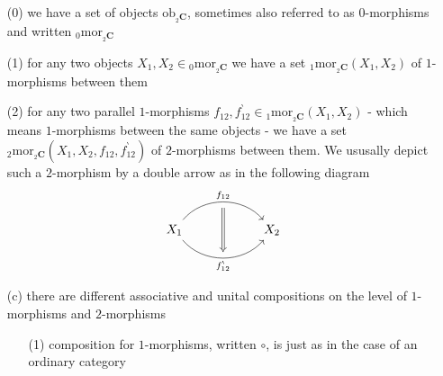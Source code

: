 \begin{enumerate}
\item[(0)]
we have a set of objects $\mathrm{ob}_{{_{2}\mathbf{C}}}$, sometimes also referred to as $0$-morphisms and written ${_{0}}\mathrm{mor}_{{_{2}\mathbf{C}}}$

\item[(1)]
for any two objects $X_{1},X_{2} \in {_{0}}\mathrm{mor}_{{_{2}\mathbf{C}}}$ we have a set ${_{1}}\mathrm{mor}_{{_{2}\mathbf{C}}}(X_{1},X_{2})$ of $1$-morphisms between them

\item[(2)]
for any two parallel $1$-morphisms $f_{12},f_{12}^{\backprime} \in {_{1}}\mathrm{mor}_{{_{2}\mathbf{C}}}(X_{1},X_{2})$ - which means $1$-morphisms between the same objects - we have a set ${_{2}}\mathrm{mor}_{{_{2}\mathbf{C}}}(X_{1},X_{2},f_{12},f_{12}^{\backprime})$ of $2$-morphisms between them. We ususally depict such a $2$-morphism by a double arrow as in the following diagram
\begin{equation*}
\begin{tikzcd}[row sep=2.4em,column sep=5.6em]
  X_{1}
  \ar[bend left=50]{r}[swap,name=U]{}{f_{12}}
  \ar[bend right=50]{r}[name=D]{}[swap]{f_{12}^{\backprime}}
  &
  X_{2}
  \ar[Rightarrow,from=U,to=D]
\end{tikzcd}
\end{equation*}

\item[(c)]
there are different associative and unital compositions on the level of $1$-morphisms and $2$-morphisms
\begin{enumerate}
\item[(1)]
composition for $1$-morphisms, written $\circ$, is just as in the case of an ordinary category


\end{enumerate}
\end{enumerate}
